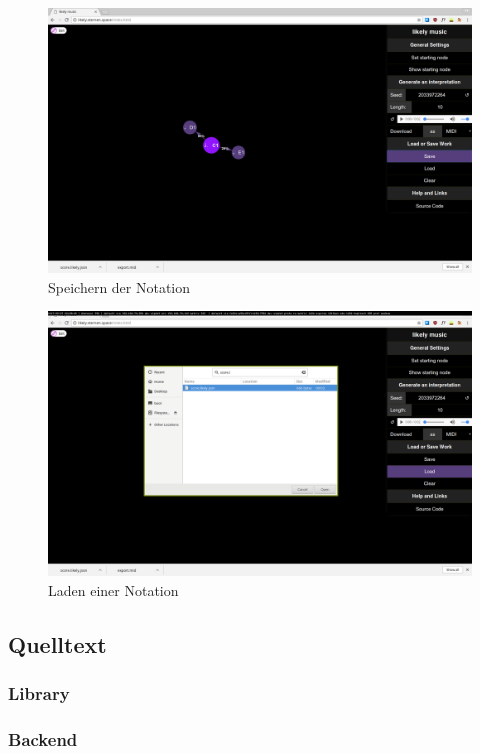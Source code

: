 \documentclass[a4paper,twocolumn]{article}
\begin{document}
\begin{figure}[H]
  \begin{center}
  \includegraphics[width=.7\textwidth]{screenshots/save.png}
  \end{center}
  \caption{Speichern der Notation}
\end{figure}

\begin{figure}[H]
  \begin{center}
  \includegraphics[width=.7\textwidth]{screenshots/load.png}
  \end{center}
  \caption{Laden einer Notation}
\end{figure}

\clearpage

\subsection*{Quelltext}
\subsubsection*{Library}
\label{sec:library}

\clearpage
\subsubsection*{Backend}
\label{sec:backend}

\vspace{20pt}

\clearpage
\end{document}
